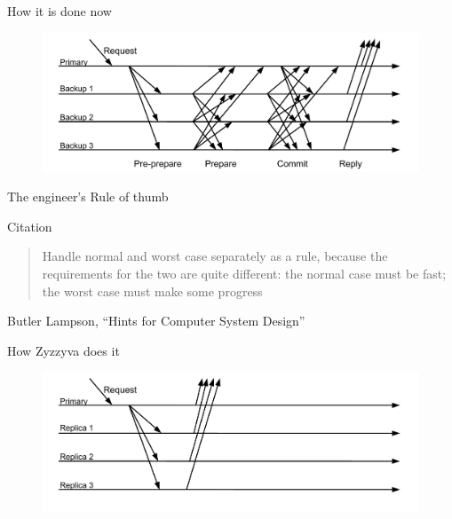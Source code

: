\begin{frame}{How it is done now}
	
\begin{figure}
	\includegraphics[width=\textwidth]{figs/17/messages4}
\end{figure}	
	
\end{frame}

\begin{frame}{The engineer's Rule of thumb}
	
\begin{block}{Citation}
\begin{quote}
Handle normal and worst case separately as a rule, because the requirements for the two are quite different:
the normal case must be fast; the worst case must make some progress
\end{quote}
Butler Lampson, “Hints for Computer System Design”
\end{block}

\end{frame}

\begin{frame}{How Zyzzyva does it}
	
\begin{figure}
	\includegraphics[width=\textwidth]{figs/17/messages5}
\end{figure}	
	
\end{frame}

